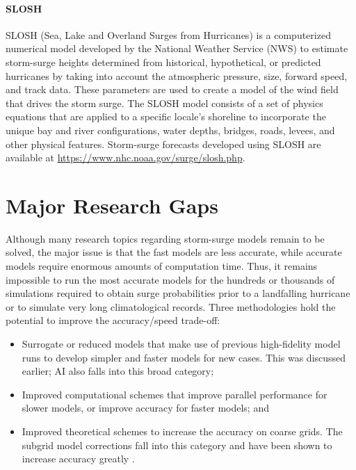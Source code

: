 \paragraph{SLOSH} SLOSH (Sea, Lake and Overland Surges from Hurricanes) is a computerized numerical model developed by the National Weather Service (NWS) to estimate storm-surge heights determined from historical, hypothetical, or predicted hurricanes by taking into account the atmospheric pressure, size, forward speed, and track data. These parameters are used to create a model of the wind field that drives the storm surge. The SLOSH model consists of a set of physics equations that are applied to a specific locale's shoreline to incorporate the unique bay and river configurations, water depths, bridges, roads, levees, and other physical features. Storm-surge forecasts developed using SLOSH are available at \url{https://www.nhc.noaa.gov/surge/slosh.php}.

\section{Major Research Gaps}
\label{sec:storm_surge_gaps}

Although many research topics regarding storm-surge models remain to be solved, the major issue is that the fast models are less accurate, while accurate models require enormous amounts of computation time. Thus, it remains impossible to run the most accurate models for the hundreds or thousands of simulations required to obtain surge probabilities prior to a landfalling hurricane or to simulate very long climatological records. Three methodologies hold the potential to improve the accuracy/speed trade-off:

\begin{itemize}
    \item Surrogate or reduced models that make use of previous high-fidelity model runs to develop simpler and faster models for new cases. This was discussed earlier; AI also falls into this broad category;

    \item Improved computational schemes that improve parallel performance for slower models, or improve accuracy for faster models; and

    \item Improved theoretical schemes to increase the accuracy on coarse grids. The subgrid model corrections fall into this category and have been shown to increase accuracy greatly \citep{kennedy2019subgrid}.
\end{itemize}

